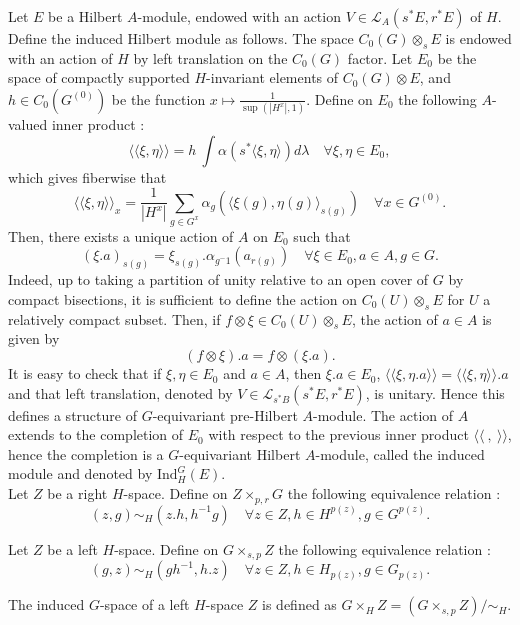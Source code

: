 Let $E$ be a Hilbert $A$-module, endowed with an action $V\in\mathcal L_A(s^*E,r^*E)$ of $H$. Define the induced Hilbert module as follows. The space $C_0(G)\otimes_s E$ is endowed with an action of $H$ by left translation on the $C_0(G)$ factor.  Let $E_0$ be the space of compactly supported $H$-invariant elements of $C_0(G)\otimes E$, and $h\in C_0(G^{(0)})$ be the function $x\mapsto \frac{1}{\sup (|H^x|,1)}$. Define on $E_0$ the following $A$-valued inner product :
\[\langle\langle \xi, \eta\rangle\rangle = h\ \int \alpha(s^*\langle \xi,\eta\rangle)d\lambda \quad \forall \xi,\eta\in E_0, \]
which gives fiberwise that 
\[\langle\langle \xi, \eta\rangle\rangle_x = \frac{1}{|H^x|}\sum_{g\in G^x} \alpha_g(\langle \xi (g),\eta (g)\rangle_{s(g)})\quad \forall x\in G^{(0)}.\]
Then, there exists a unique action of $A$ on $E_0$ such that 
\[(\xi .a)_{s(g)} = \xi_{s(g)}.\alpha_{g^-1}(a_{r(g)}) \quad \forall \xi \in E_0, a\in A,g\in G.\]
Indeed, up to taking a partition of unity relative to an open cover of $G$ by compact bisections, it is sufficient to define the action on $C_0(U)\otimes_s E $ for $U$ a relatively compact subset. Then, if $f\otimes \xi \in C_0(U)\otimes_s E $, the action of $a\in A$ is given by 
\[(f\otimes \xi ) . a = f\otimes (\xi.a ).  \]
It is easy to check that if $\xi,\eta\in E_0$ and $a\in A$, then $\xi.a\in E_0$, $\langle\langle \xi,\eta.a \rangle\rangle= \langle\langle \xi,\eta \rangle\rangle . a$ and that left translation, denoted by $V\in\mathcal L_{s^* B}(s^* E, r^* E)$, is unitary. Hence this defines a structure of $G$-equivariant pre-Hilbert $A$-module. The action of $A$ extends to the completion of $E_0$ with respect to the previous inner product $\langle\langle \ , \ \rangle\rangle$, hence the completion is a $G$-equivariant Hilbert $A$-module, called the induced module and denoted by $\text{Ind}_H^G (E)$.\\  

Let $Z$ be a right $H$-space. Define on $Z\times_{p,r} G$ the following equivalence relation :
\[(z,g)\sim_H (z.h, h^{-1}g)\quad \forall z\in Z, h\in H^{p(z)},g\in G^{p(z)}.\]

Let $Z$ be a left $H$-space. Define on $G \times_{s,p} Z $ the following equivalence relation :
\[(g,z)\sim_H (gh^{-1}, h.z)\quad \forall z\in Z, h\in H_{p(z)},g\in G_{p(z)}.\]

\begin{definition}
The induced $G$-space of a left $H$-space $Z$ is defined as $ G\times_H Z = (G \times_{s,p} Z) / \sim_H$. 
\end{definition}

